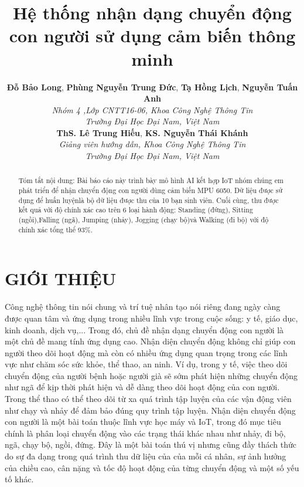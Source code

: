 \documentclass[journal]{IEEEtran}
\begin{document}
\title{Hệ thống nhận dạng chuyển động con người sử dụng cảm
biến thông minh}

\author{\textbf{Đỗ Bảo Long}, \textbf{Phùng Nguyễn Trung Đức}, \textbf{Tạ Hồng Lịch}, \textbf{Nguyễn Tuấn Anh}\\
        \textit{Nhóm 4 ,Lớp CNTT16-06, Khoa Công Nghệ Thông Tin} \\ 
        \textit{Trường Đại Học Đại Nam, Việt Nam} \\
        \textbf{ThS. Lê Trung Hiếu}, \textbf{KS. Nguyễn Thái Khánh} \\ 
        \textit{Giảng viên hướng dẫn, Khoa Công Nghệ Thông Tin} \\ 
        \textit{Trường Đại Học Đại Nam, Việt Nam}
}
     

\maketitle
\thispagestyle{plain}
\begin{abstract} 
Tóm tắt nội dung: Bài báo cáo này trình bày mô hình AI kết hợp IoT nhóm chúng em phát triển để nhận chuyển động con người dùng cảm biến MPU 6050. Dữ liệu được sử dụng để huấn luyệnlà bộ dữ liệu được thu của 10 bạn sinh viên. Cuối cùng, thu được kết quả với độ chính xác cao trên 6 loại hành động: Standing (đứng), Sitting (ngồi),Falling (ngã), Jumping (nhảy), Jogging (chạy bộ)và Walking (đi bộ) với độ chính xác tổng thể 93\%.
\end{abstract}
\section{GIỚI THIỆU}

Công nghệ thông tin nói chung và trí tuệ nhân tạo
nói riêng đang ngày càng được quan tâm và ứng
dụng trong nhiều lĩnh vực trong cuộc sống: y tế,
giáo dục, kinh doanh, dịch vụ,... Trong đó, chủ
đề nhận dạng chuyển động con người là một chủ
đề mang tính ứng dụng cao. Nhận diện chuyển
động không chỉ giúp con người theo dõi hoạt động
mà còn có nhiều ứng dụng quan trọng trong các
lĩnh vực như chăm sóc sức khỏe, thể thao, an
ninh. Ví dụ, trong y tế, việc theo dõi chuyển động
của người bệnh hoặc người già sẽ sớm phát hiện
những chuyển động như ngã để kịp thời phát hiện
và dễ dàng theo dõi hoạt động của con người.
Trong thể thao có thể theo dõi từ xa quá trình tập
luyện của các vận động viên như chạy và nhảy
để đảm bảo đúng quy trình tập luyện. Nhận diện
chuyển động con người là một bài toán thuộc lĩnh
vực học máy và IoT, trong đó mục tiêu chính là
phân loại chuyển động vào các trạng thái khác
nhau như nhảy, đi bộ, ngã, chạy bộ, ngồi, đứng.
Đây là một bài toán thú vị nhưng cũng đầy thách
thức do sự đa dạng trong quá trình thu dữ liệu của
của mỗi cá nhân, sự ảnh hưởng của chiều cao, cân
nặng và tốc độ hoạt động của từng chuyển động
và một số yếu tố khác.
\end{document}
